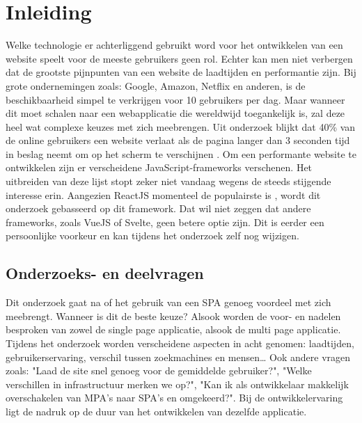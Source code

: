 \documentclass{hogent-article}
\affiliation{
  \textsuperscript{1} \href{mailto:jens.penneman@student.hogent.be}{jens.penneman@student.hogent.be}}
\begin{document}
\flushbottom
\maketitle
\tableofcontents
\thispagestyle{empty}


\section{Inleiding}
Welke technologie er achterliggend gebruikt word voor het ontwikkelen van een website speelt voor de meeste gebruikers geen rol.
Echter kan men niet verbergen dat de grootste pijnpunten van een website de laadtijden en performantie zijn.
Bij grote ondernemingen zoals: Google, Amazon, Netflix en anderen, is de beschikbaarheid simpel te verkrijgen voor 10 gebruikers per dag.
Maar wanneer dit moet schalen naar een webapplicatie die wereldwijd toegankelijk is, zal deze heel wat complexe keuzes met zich meebrengen.
Uit onderzoek blijkt dat 40\% van de online gebruikers een website verlaat als de pagina langer dan 3 seconden tijd in beslag neemt om op het scherm te verschijnen \autocite{LoadingSpeedWedevs2021}.
Om een performante website te ontwikkelen zijn er verscheidene JavaScript-frameworks verschenen. Het uitbreiden van deze lijst stopt zeker niet vandaag wegens de steeds stijgende interesse erin.
Aangezien ReactJS momenteel de populairste is \autocite{Gathoni2022}, wordt dit onderzoek gebasseerd op dit framework.
Dat wil niet zeggen dat andere frameworks, zoals VueJS of Svelte, geen betere optie zijn.
Dit is eerder een persoonlijke voorkeur en kan tijdens het onderzoek zelf nog wijzigen.

\subsection{Onderzoeks- en deelvragen}
Dit onderzoek gaat na of het gebruik van een SPA genoeg voordeel met zich meebrengt.
Wanneer is dit de beste keuze?
Alsook worden de voor- en nadelen besproken van zowel de single page applicatie, alsook de multi page applicatie.
Tijdens het onderzoek worden verscheidene aspecten in acht genomen:
laadtijden,
gebruikerservaring,
verschil tussen zoekmachines en mensen\dots
Ook andere vragen zoals:
"Laad de site snel genoeg voor de gemiddelde gebruiker?",
"Welke verschillen in infrastructuur merken we op?",
"Kan ik als ontwikkelaar makkelijk overschakelen van MPA's naar SPA's en omgekeerd?".
Bij de ontwikkelervaring ligt de nadruk op de duur van het ontwikkelen van dezelfde applicatie.
\end{document}
